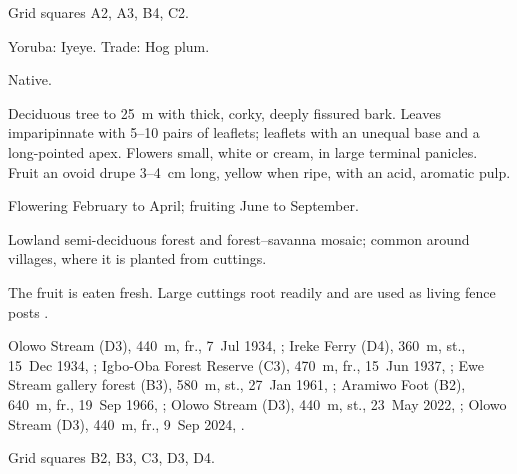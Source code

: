 Grid squares A2, A3, B4, C2.

\begin{center}
\end{center}

\label{sp:ANA02}

 

 Yoruba: Iyeye. Trade: Hog plum.

 Native.

 Deciduous tree to 25~m with thick, corky, deeply
fissured bark. Leaves imparipinnate with 5--10 pairs of leaflets;
leaflets with an unequal base and a long-pointed apex. Flowers small,
white or cream, in large terminal panicles. Fruit an ovoid drupe
3--4~cm long, yellow when ripe, with an acid, aromatic pulp.

 Flowering February to April; fruiting June to
September.

 Lowland semi-deciduous forest and forest--savanna
mosaic; common around villages, where it is planted from cuttings.

 The fruit is eaten fresh. Large cuttings root readily and
are used as living fence posts \citep{keay1989,burkill1985}.

 Olowo Stream (D3), 440~m, fr., 7~Jul 1934, ;
Ireke Ferry (D4), 360~m, st., 15~Dec 1934, ;
Igbo-Oba Forest Reserve (C3), 470~m, fr., 15~Jun 1937, ;
Ewe Stream gallery forest (B3), 580~m, st., 27~Jan 1961, ;
Aramiwo Foot (B2), 640~m, fr., 19~Sep 1966, ;
Olowo Stream (D3), 440~m, st., 23~May 2022, ;
Olowo Stream (D3), 440~m, fr., 9~Sep 2024, .

 Grid squares B2, B3, C3, D3, D4.

\begin{center}
\end{center}
